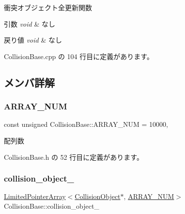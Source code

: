 衝突オブジェクト全更新関数 


\begin{DoxyParams}{引数}
{\em void} & なし \\
\hline
\end{DoxyParams}

\begin{DoxyRetVals}{戻り値}
{\em void} & なし \\
\hline
\end{DoxyRetVals}


 Collision\+Base.\+cpp の 104 行目に定義があります。



\subsection{メンバ詳解}
\mbox{\label{class_collision_base_a0ddcdd5ed993b19c6edabd9c50e76ba4}} 
\subsubsection{\texorpdfstring{A\+R\+R\+A\+Y\+\_\+\+N\+UM}{ARRAY\_NUM}}
{\footnotesize\ttfamily const unsigned Collision\+Base\+::\+A\+R\+R\+A\+Y\+\_\+\+N\+UM = 10000\hspace{0.3cm}{\ttfamily [static]}, {\ttfamily [private]}}



配列数 



 Collision\+Base.\+h の 52 行目に定義があります。

\mbox{\label{class_collision_base_af12edcd99a26ac7636cc6f6b59feca81}} 
\subsubsection{\texorpdfstring{collision\+\_\+object\+\_\+}{collision\_object\_}}
{\footnotesize\ttfamily \mbox{\hyperlink{class_limited_pointer_array}{Limited\+Pointer\+Array}}$<$\mbox{\hyperlink{class_collision_object}{Collision\+Object}}$\ast$, \mbox{\hyperlink{class_collision_base_a0ddcdd5ed993b19c6edabd9c50e76ba4}{A\+R\+R\+A\+Y\+\_\+\+N\+UM}}$>$ Collision\+Base\+::collision\+\_\+object\+\_\+\hspace{0.3cm}{\ttfamily [private]}}



